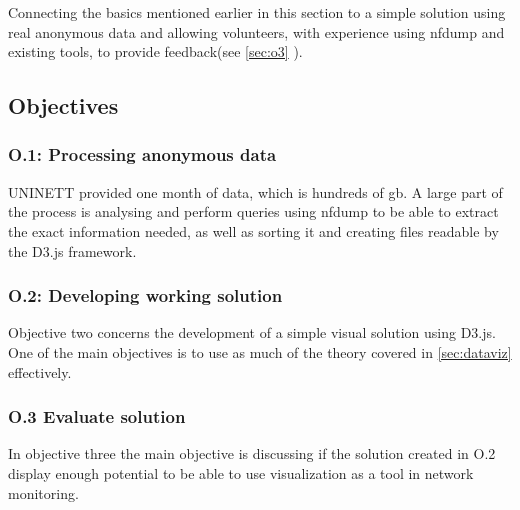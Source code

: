 Connecting the basics mentioned earlier in this section to a simple solution using real anonymous data and allowing volunteers, with experience using nfdump and existing tools, to provide feedback(see \ref{sec:o3} ). 

\subsection{Objectives}

\subsubsection{O.1:  Processing anonymous data}
UNINETT provided one month of data, which is hundreds of \gls{gb}. A large part of the process is analysing and perform queries using nfdump to be able to extract the exact information needed, as well as sorting it and creating files readable by the D3.js framework. 
\subsubsection{O.2:   Developing working solution}
Objective two concerns the development of a simple visual solution using D3.js. One of the main objectives is to use as much of the theory covered in \ref{sec:dataviz} effectively. 
\subsubsection{O.3   Evaluate solution}
In objective three the main objective is discussing if the solution created in O.2 display enough potential to be able to use visualization as a tool in network monitoring.
\label{sec:o3}

